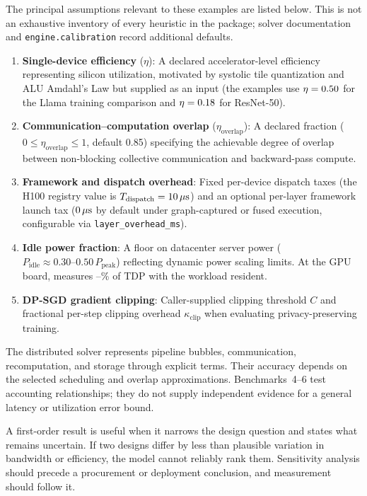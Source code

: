 \documentclass[10pt,twocolumn]{article}
\begin{document}
The principal assumptions relevant to these examples are listed below. This is not an exhaustive inventory of every heuristic in the package; solver documentation and \texttt{engine.calibration} record additional defaults.
\begin{enumerate}[leftmargin=*,itemsep=1pt]
\item \textbf{Single-device efficiency} ($\eta$): A declared accelerator-level efficiency representing silicon utilization, motivated by systolic tile quantization and ALU Amdahl's Law but supplied as an input (the examples use $\eta=0.50$ for the Llama training comparison and $\eta=0.18$ for ResNet-50).
\item \textbf{Communication--computation overlap} ($\eta_{\text{overlap}}$): A declared fraction ($0 \le \eta_{\text{overlap}} \le 1$, default 0.85) specifying the achievable degree of overlap between non-blocking collective communication and backward-pass compute.
\item \textbf{Framework and dispatch overhead}: Fixed per-device dispatch taxes (the H100 registry value is $T_{\text{dispatch}} = 10\,\mu\text{s}$) and an optional per-layer framework launch tax ($0\,\mu\text{s}$ by default under graph-captured or fused execution, configurable via \texttt{layer\_overhead\_ms}).
\item \textbf{Idle power fraction}: A floor on datacenter server power ($P_{\text{idle}} \approx 0.30\text{--}0.50\,P_{\text{peak}}$) reflecting dynamic power scaling limits. At the GPU board,  measures \EnergyIdleLowPct--\EnergyIdleHighPct\% of TDP with the workload resident.
\item \textbf{DP-SGD gradient clipping}: Caller-supplied clipping threshold $C$ and fractional per-step clipping overhead $\kappa_{\text{clip}}$ when evaluating privacy-preserving training.
\end{enumerate}
The distributed solver represents pipeline bubbles, communication, recomputation, and storage through explicit terms. Their accuracy depends on the selected scheduling and overlap approximations. Benchmarks~4--6 test accounting relationships; they do not supply independent evidence for a general latency or utilization error bound.

A first-order result is useful when it narrows the design question and states what remains uncertain. If two designs differ by less than plausible variation in bandwidth or efficiency, the model cannot reliably rank them. Sensitivity analysis should precede a procurement or deployment conclusion, and measurement should follow it.
\end{document}
